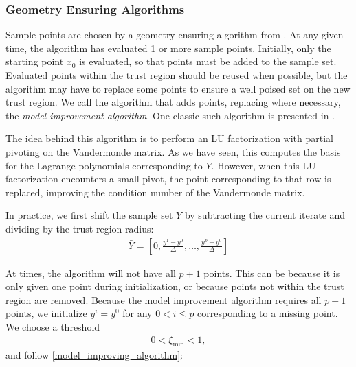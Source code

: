 \documentclass{article}
\theoremstyle{case}
\numberwithin{theorem}{subsection}
\newcommand{\ximin}{\xi_{\text{min}}}
\begin{document}
\subsubsection{Geometry Ensuring Algorithms}

Sample points are chosen by a geometry ensuring algorithm from \cite{DUMMY:intro_book}.
At any given time, the algorithm has evaluated 1 or more sample points.
Initially, only the starting point $x_0$ is evaluated, so that points must be added to the sample set.
Evaluated points within the trust region should be reused when possible, but the algorithm may have to replace some points to ensure a well poised set on the new trust region.
We call the algorithm that adds points, replacing where necessary, the \emph{model improvement algorithm}.
One classic such algorithm is presented in \cite{DUMMY:intro_book}.

The idea behind this algorithm is to perform an LU factorization with partial pivoting on the Vandermonde matrix.
As we have seen, this computes the basis for the Lagrange polynomials corresponding to $Y$.
However, when this LU factorization encounters a small pivot, the point corresponding to that row is replaced, improving the condition number of the Vandermonde matrix.

In practice, we first shift the sample set $Y$ by subtracting the current iterate and dividing by the trust region radius:
\begin{align}
\bar{Y} = [0, \frac{y^1 - y^0}{\Delta}, \ldots, \frac{y^p - y^0}{\Delta}]
\end{align}

At times, the algorithm will not have all $p+1$ points.
This can be because it is only given one point during initialization, or because points not within the trust region are removed.
Because the model improvement algorithm requires all $p+1$ points, we initialize $y^i = y^0$ for any $0 < i \le p$ corresponding to a missing point.
We choose a threshold 
\begin{align}
0 < \ximin < 1 \label{define_ximin},
\end{align} and follow \cref{model_improving_algorithm}:
\end{document}
